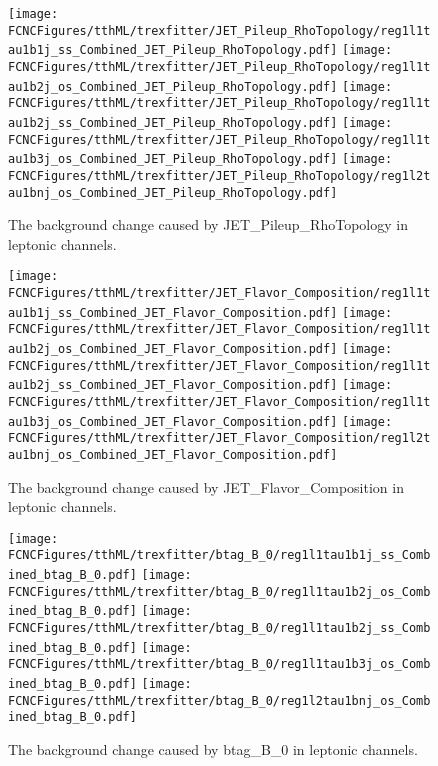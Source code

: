 \begin{figure}[H]
\centering
\texttt{[image: \\FCNCFigures/tthML/trexfitter/JET\_Pileup\_RhoTopology/reg1l1tau1b1j\_ss\_Combined\_JET\_Pileup\_RhoTopology.pdf]}
\texttt{[image: \\FCNCFigures/tthML/trexfitter/JET\_Pileup\_RhoTopology/reg1l1tau1b2j\_os\_Combined\_JET\_Pileup\_RhoTopology.pdf]}
\texttt{[image: \\FCNCFigures/tthML/trexfitter/JET\_Pileup\_RhoTopology/reg1l1tau1b2j\_ss\_Combined\_JET\_Pileup\_RhoTopology.pdf]}
\texttt{[image: \\FCNCFigures/tthML/trexfitter/JET\_Pileup\_RhoTopology/reg1l1tau1b3j\_os\_Combined\_JET\_Pileup\_RhoTopology.pdf]}
\texttt{[image: \\FCNCFigures/tthML/trexfitter/JET\_Pileup\_RhoTopology/reg1l2tau1bnj\_os\_Combined\_JET\_Pileup\_RhoTopology.pdf]}
\caption{The background change caused by JET\_Pileup\_RhoTopology in leptonic channels.}
\label{fig:tthML_Pileup_Rho_Topology}
\end{figure}

\begin{figure}[H]
\centering
\texttt{[image: \\FCNCFigures/tthML/trexfitter/JET\_Flavor\_Composition/reg1l1tau1b1j\_ss\_Combined\_JET\_Flavor\_Composition.pdf]}
\texttt{[image: \\FCNCFigures/tthML/trexfitter/JET\_Flavor\_Composition/reg1l1tau1b2j\_os\_Combined\_JET\_Flavor\_Composition.pdf]}
\texttt{[image: \\FCNCFigures/tthML/trexfitter/JET\_Flavor\_Composition/reg1l1tau1b2j\_ss\_Combined\_JET\_Flavor\_Composition.pdf]}
\texttt{[image: \\FCNCFigures/tthML/trexfitter/JET\_Flavor\_Composition/reg1l1tau1b3j\_os\_Combined\_JET\_Flavor\_Composition.pdf]}
\texttt{[image: \\FCNCFigures/tthML/trexfitter/JET\_Flavor\_Composition/reg1l2tau1bnj\_os\_Combined\_JET\_Flavor\_Composition.pdf]}
\caption{The background change caused by JET\_Flavor\_Composition in leptonic channels.}
\label{fig:tthML_JET_Flavor_Composition}
\end{figure}






\begin{figure}[H]
\centering
\texttt{[image: \\FCNCFigures/tthML/trexfitter/btag\_B\_0/reg1l1tau1b1j\_ss\_Combined\_btag\_B\_0.pdf]}
\texttt{[image: \\FCNCFigures/tthML/trexfitter/btag\_B\_0/reg1l1tau1b2j\_os\_Combined\_btag\_B\_0.pdf]}
\texttt{[image: \\FCNCFigures/tthML/trexfitter/btag\_B\_0/reg1l1tau1b2j\_ss\_Combined\_btag\_B\_0.pdf]}
\texttt{[image: \\FCNCFigures/tthML/trexfitter/btag\_B\_0/reg1l1tau1b3j\_os\_Combined\_btag\_B\_0.pdf]}
\texttt{[image: \\FCNCFigures/tthML/trexfitter/btag\_B\_0/reg1l2tau1bnj\_os\_Combined\_btag\_B\_0.pdf]}
\caption{The background change caused by btag\_B\_0 in leptonic channels.}
\label{fig:tthML_btag_B_0}
\end{figure}

